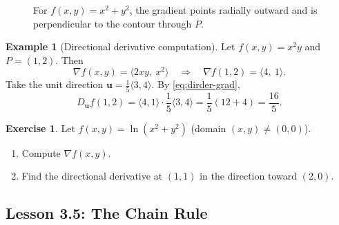 \documentclass[12pt]{article}
\numberwithin{equation}{section}
\newcommand{\vect}[1]{\boldsymbol{#1}}   %
\theoremstyle{plain}
\theoremstyle{definition}
\newtheorem{example}[theorem]{Example}
\newtheorem{exercise}[theorem]{Exercise}
\theoremstyle{remark}
\begin{document}
\begin{figure}[H]
\centering
{}
\caption{For $f(x,y)=x^2+y^2$, the gradient points radially outward and is perpendicular to the contour through $P$.}
\label{fig:grad-perp}
\end{figure}

\begin{example}[Directional derivative computation]
Let $f(x,y)=x^2y$ and $P=(1,2)$. Then
\[
\nabla f(x,y)=\langle 2xy,\ x^2\rangle
\quad\Longrightarrow\quad
\nabla f(1,2)=\langle 4,\ 1\rangle.
\]
Take the unit direction $\vect u=\frac{1}{5}\langle 3,4\rangle$. By \cref{eq:dirder-grad},
\[
D_{\vect u}f(1,2)=\langle 4,1\rangle\cdot \frac{1}{5}\langle 3,4\rangle
=\frac{1}{5}(12+4)=\frac{16}{5}.
\]
\end{example}

\begin{exercise}
Let $f(x,y)=\ln(x^2+y^2)$ (domain $(x,y)\neq(0,0)$).
\begin{enumerate}[label=(\alph*)]
\item Compute $\nabla f(x,y)$.
\item Find the directional derivative at $(1,1)$ in the direction toward $(2,0)$.
\end{enumerate}
\end{exercise}

\subsection{Lesson 3.5: The Chain Rule}
\end{document}
